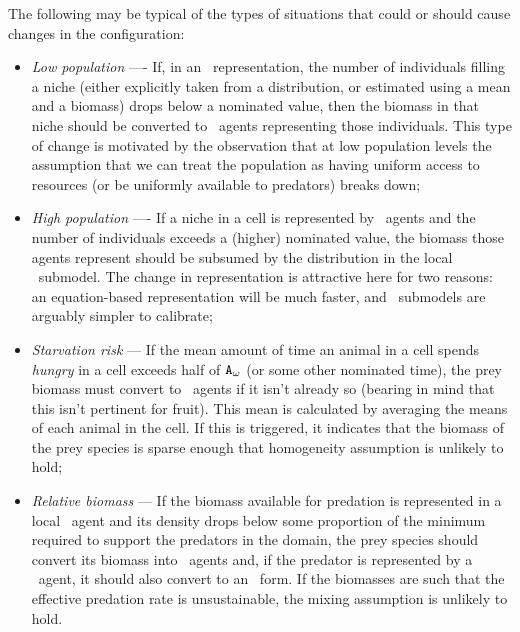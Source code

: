 The following may be typical of the types of situations that could or
should cause changes in the con\-fig\-ur\-a\-tion:
\begin{itemize}
  \item \emph{Low population} ---- If, in an \SD\ representa\-tion,
    the number of in\-di\-vidu\-als filling a niche (either explicitly taken
    from a distribution, or estimated using a mean and a biomass)
    drops below a nominated value, then the biomass in that niche
    should be converted to \IB\ agents representing those
    in\-di\-vidu\-als. This type of change is motivated by the observation
    that at low population levels the assumption that we can treat the
    population as having uniform access to resources (or be uniformly
    available to predators) breaks down;

  \item \emph{High population} ---- If a niche in a cell is
    represented by \IB\ agents and the number of in\-di\-vidu\-als exceeds a
    (higher) nominated value, the biomass those agents represent
    should be subsumed by the distribution in the local
    \SD\ submodel. The change in rep\-re\-sen\-ta\-tion is attractive here for
    two reasons: an equation-based rep\-re\-sen\-ta\-tion will be much faster,
    and \SD\ submodels are arguably simpler to calibrate;

  \item \emph{Starvation risk} --- If the mean amount of time an
    animal in a cell spends \emph{hungry} in a cell exceeds half of
    $\texttt{A}_\omega$ (or some other nominated time), the prey biomass
    must convert to \IB\ agents if it isn't already so (bearing in
    mind that this isn't pertinent for fruit). This mean is calculated
    by averaging the means of each animal in the cell. If this is
    triggered, it indicates that the biomass of the prey species is
    sparse enough that homogeneity assumption is unlikely to hold;

  \item \emph{Relative biomass} --- If the biomass available for
    predation is represented in a local \SD\ agent and its density
    drops below some proportion of the minimum required to support the
    predators in the domain, the prey species should convert its
    biomass into \IB\ agents and, if the predator is represented by a
    \SD\ agent, it should also convert to an \IB\ form. If the
    biomasses are such that the effective predation rate is
    unsustainable, the mixing assumption is unlikely to hold.
\end{itemize}

